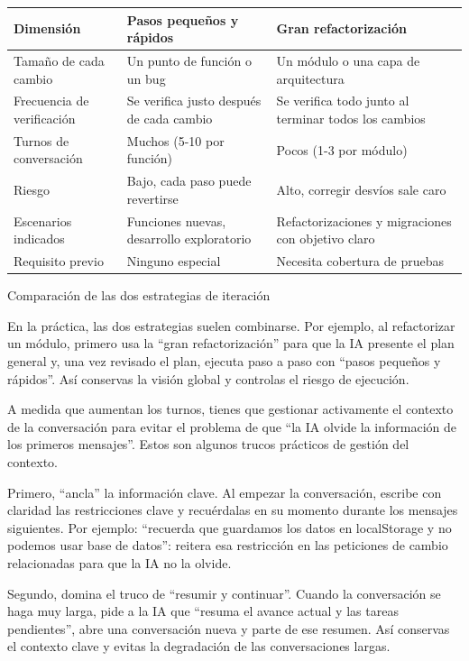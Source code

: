 \begin{center}
\begin{tabularx}{\linewidth}{|X|X|X|}
\hline
\textbf{Dimensión} & \textbf{Pasos pequeños y rápidos} & \textbf{Gran refactorización} \tabularnewline
\hline
Tamaño de cada cambio & Un punto de función o un bug & Un módulo o una capa de arquitectura \tabularnewline
Frecuencia de verificación & Se verifica justo después de cada cambio & Se verifica todo junto al terminar todos los cambios \tabularnewline
Turnos de conversación & Muchos (5-10 por función) & Pocos (1-3 por módulo) \tabularnewline
Riesgo & Bajo, cada paso puede revertirse & Alto, corregir desvíos sale caro \tabularnewline
Escenarios indicados & Funciones nuevas, desarrollo exploratorio & Refactorizaciones y migraciones con objetivo claro \tabularnewline
Requisito previo & Ninguno especial & Necesita cobertura de pruebas \tabularnewline
\hline
\end{tabularx}
\end{center}

\begin{center}\small\color{gray}Comparación de las dos estrategias de iteración\end{center}

En la práctica, las dos estrategias suelen combinarse. Por ejemplo, al refactorizar un módulo, primero usa la “gran refactorización” para que la IA presente el plan general y, una vez revisado el plan, ejecuta paso a paso con “pasos pequeños y rápidos”. Así conservas la visión global y controlas el riesgo de ejecución.


A medida que aumentan los turnos, tienes que gestionar activamente el contexto de la conversación para evitar el problema de que “la IA olvide la información de los primeros mensajes”. Estos son algunos trucos prácticos de gestión del contexto.

Primero, “ancla” la información clave. Al empezar la conversación, escribe con claridad las restricciones clave y recuérdalas en su momento durante los mensajes siguientes. Por ejemplo: “recuerda que guardamos los datos en localStorage y no podemos usar base de datos”: reitera esa restricción en las peticiones de cambio relacionadas para que la IA no la olvide.

Segundo, domina el truco de “resumir y continuar”. Cuando la conversación se haga muy larga, pide a la IA que “resuma el avance actual y las tareas pendientes”, abre una conversación nueva y parte de ese resumen. Así conservas el contexto clave y evitas la degradación de las conversaciones largas.

